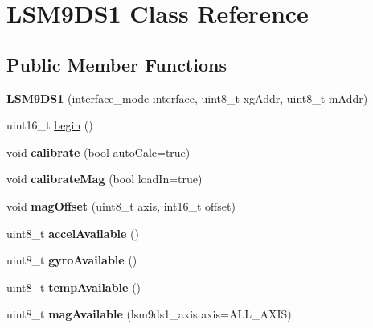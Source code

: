 \hypertarget{classLSM9DS1}{}\section{L\+S\+M9\+D\+S1 Class Reference}
\label{classLSM9DS1}
\subsection*{Public Member Functions}
\begin{DoxyCompactItemize}
\item 
\mbox{\label{classLSM9DS1_ab62923063ffc49dca82e6f311c5c8764}} 
{\bfseries L\+S\+M9\+D\+S1} (interface\+\_\+mode interface, uint8\+\_\+t xg\+Addr, uint8\+\_\+t m\+Addr)
\item 
uint16\+\_\+t \mbox{\hyperlink{classLSM9DS1_a8728e560c76bd120b3711af15a6ecbd6}{begin}} ()
\item 
\mbox{\label{classLSM9DS1_a97939cb15fcb7e33abcd6d3a9230d943}} 
void {\bfseries calibrate} (bool auto\+Calc=true)
\item 
\mbox{\label{classLSM9DS1_afb45f0bcbcbeb15d4bd1a28821b24d14}} 
void {\bfseries calibrate\+Mag} (bool load\+In=true)
\item 
\mbox{\label{classLSM9DS1_a0d461614bd058b082c94481dc916c18b}} 
void {\bfseries mag\+Offset} (uint8\+\_\+t axis, int16\+\_\+t offset)
\item 
\mbox{\label{classLSM9DS1_a515ce6f5c199a86c6aa5be353b2a3a13}} 
uint8\+\_\+t {\bfseries accel\+Available} ()
\item 
\mbox{\label{classLSM9DS1_a65b71a03a30f4e8ed1ffd46de3db0560}} 
uint8\+\_\+t {\bfseries gyro\+Available} ()
\item 
\mbox{\label{classLSM9DS1_aaf6683c6f3f0281d5222b74f580f321b}} 
uint8\+\_\+t {\bfseries temp\+Available} ()
\item 
\mbox{\label{classLSM9DS1_a85afd29e95bead7b3f0083a9a235d1df}} 
uint8\+\_\+t {\bfseries mag\+Available} (lsm9ds1\+\_\+axis axis=A\+L\+L\+\_\+\+A\+X\+IS)
\item 

\end{DoxyCompactItemize}
